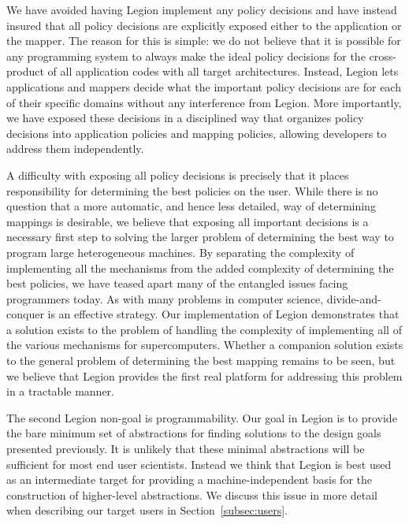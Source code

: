 We have avoided having Legion implement any
policy decisions and have instead insured that
all policy decisions are explicitly exposed 
either to the application or the mapper. The
reason for this is simple: we do not believe
that it is possible for any programming system
to always make the ideal policy decisions for the cross-product
of all application codes with all target architectures.
Instead, Legion lets applications and mappers 
decide what the important policy decisions are 
for each of their specific domains without any 
interference from Legion. More importantly, we have 
exposed these decisions in a disciplined way that 
organizes policy decisions into application policies 
and mapping policies, allowing developers to address 
them independently.

A difficulty with exposing all policy decisions is
precisely that it places responsibility for determining
the best policies on the user. While there is no question
that a more automatic, and hence less detailed, way of
determining mappings is desirable, we believe that
exposing all important decisions is a necessary first
step to solving the larger problem of determining the
best way to program large heterogeneous machines. By
separating the complexity of implementing all the 
mechanisms from the added complexity of determining
the best policies, we have teased apart many of the
entangled issues facing programmers today. As with 
many problems in computer science, divide-and-conquer
is an effective strategy. Our implementation of Legion 
demonstrates that a solution exists to the problem of 
handling the complexity of implementing all of the 
various mechanisms for supercomputers. Whether a companion
solution exists to the general problem of determining the best mapping
remains to be seen, but we believe that Legion 
provides the first real platform for addressing
this problem in a tractable manner.

The second Legion non-goal is programmability. Our
goal in Legion is to provide the bare minimum set
of abstractions for finding solutions to the design
goals presented previously. It is unlikely that these
minimal abstractions will be sufficient for most
end user scientists. Instead we think that Legion
is best used as an intermediate target for providing
a machine-independent basis for the construction
of higher-level abstractions. We discuss this issue 
in more detail when describing our target users
in Section~\ref{subsec:users}.

